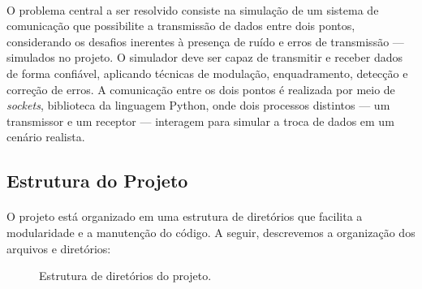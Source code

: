 \documentclass[12pt, a4paper]{article}
\begin{document}
\paragraph{}
O problema central a ser resolvido consiste na simulação de um sistema de comunicação que possibilite a transmissão de dados entre dois pontos, considerando os desafios inerentes à presença de ruído e erros de transmissão — simulados no projeto. O simulador deve ser capaz de transmitir e receber dados de forma confiável, aplicando técnicas de modulação, enquadramento, detecção e correção de erros. A comunicação entre os dois pontos é realizada por meio de \textit{sockets}, biblioteca da linguagem Python, onde dois processos distintos — um transmissor e um receptor — interagem para simular a troca de dados em um cenário realista.

\newpage

\subsection{Estrutura do Projeto}
\paragraph{}
O projeto está organizado em uma estrutura de diretórios que facilita a modularidade e a manutenção do código. A seguir, descrevemos a organização dos arquivos e diretórios:

\begin{figure}[ht]
    \centering
    \begin{mdframed}[
        linewidth=0pt, %
        roundcorner=10pt, %
        backgroundcolor=cinza_claro, %
        innertopmargin=10pt, %
        innerbottommargin=10pt,
        innerleftmargin=20pt,
        innerrightmargin=20pt
    ]
    \end{mdframed}
    \caption{Estrutura de diretórios do projeto.}
    \label{fig:estrutura}
\end{figure}
\end{document}
